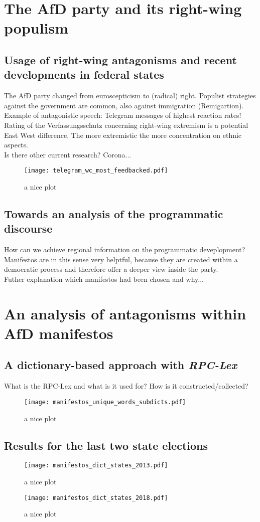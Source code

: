 \documentclass[a4paper]{scrreprt}
\begin{document}
\chapter{The AfD party and its right-wing populism}
\section{Usage of right-wing antagonisms and recent developments in federal states}
The AfD party changed from euroscepticism to (radical) right. Populist strategies against the government are common, also against immigration (Remigartion).\\
Example of antagonistic speech: Telegram messages of highest reaction rates!\\
Rating of the Verfassungsschutz concerning right-wing extremism is a potential East West difference. The more extremistic the more concentration on ethnic aspects.\\
Is there other current research? Corona...
\begin{figure}
    \centering
    \texttt{[image: telegram\_wc\_most\_feedbacked.pdf]}
    \caption{a nice plot}
\end{figure}
\section{Towards an analysis of the programmatic discourse}
How can we achieve regional information on the programmatic deveplopment? Manifestos are in this sense very helptful, because they are created within a democratic process and therefore offer a deeper view inside the party.\\
Futher explanation which manifestos had been chosen and why...
\chapter{An analysis of antagonisms within AfD manifestos}
\section{A dictionary-based approach with \em RPC-Lex}
What is the RPC-Lex and what is it used for? How is it constructed/collected?
\begin{figure}
    \centering
    \texttt{[image: manifestos\_unique\_words\_subdicts.pdf]}
    \caption{a nice plot}
\end{figure}
\section{Results for the last two state elections}
\begin{figure}
    \centering
    \texttt{[image: manifestos\_dict\_states\_2013.pdf]}
    \caption{a nice plot}
\end{figure}
\begin{figure}
    \centering
    \texttt{[image: manifestos\_dict\_states\_2018.pdf]}
    \caption{a nice plot}
\end{figure}
\end{document}

